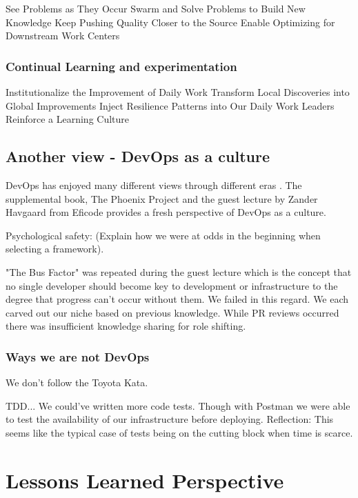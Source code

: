 \documentclass{article}
\begin{document}
    See Problems as They Occur
    Swarm and Solve Problems to Build New Knowledge
    Keep Pushing Quality Closer to the Source
    Enable Optimizing for Downstream Work Centers


\subsubsection{Continual Learning and experimentation}

    Institutionalize the Improvement of Daily Work
    Transform Local Discoveries into Global Improvements
    Inject Resilience Patterns into Our Daily Work
    Leaders Reinforce a Learning Culture


\subsection{Another view - DevOps as a culture}

DevOps has enjoyed many different views through different eras \cite{devopsviewsthrougheras}. The supplemental book, The Phoenix Project \cite{thephoenixproject} and the guest lecture by Zander Havgaard from Eficode provides a fresh perspective of DevOps as a culture. 


Psychological safety: (Explain how we were at odds in the beginning when selecting a framework). 

"The Bus Factor" was repeated during the guest lecture which is the concept that no single developer should become key to development or infrastructure to the degree that progress can't occur without them. We failed in this regard. We each carved out our niche based on previous knowledge. While PR reviews occurred there was insufficient knowledge sharing for role shifting. 

\subsubsection{Ways we are not DevOps}

We don't follow the Toyota Kata. 

TDD... We could've written more code tests. Though with Postman we were able to test the availability of our infrastructure before deploying. Reflection: This seems like the typical case of tests being on the cutting block when time is scarce. 


\section{Lessons Learned Perspective}
\end{document}
